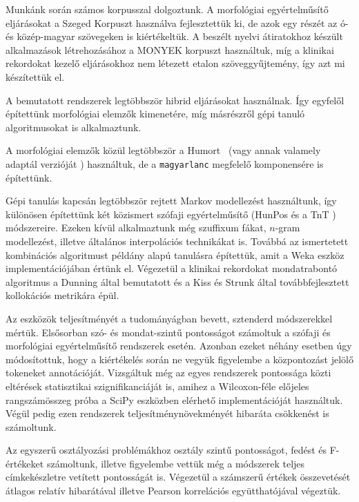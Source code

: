 Munkánk során számos korpusszal dolgoztunk.
A morfológiai egyértelműsítő eljárásokat a Szeged Korpuszt \cite{Csendes2004} használva fejlesztettük ki, de azok egy részét az ó- és közép-magyar szövegeken \cite{Novak2013} is kiértékeltük.
A beszélt nyelvi átiratokhoz készült alkalmazások létrehozásához a MONYEK korpuszt \cite{Matyus2014} használtuk, míg a klinikai rekordokat kezelő eljárásokhoz nem létezett etalon szöveggyűjtemény, így azt mi készítettük el.

A bemutatott rendszerek legtöbbször hibrid eljárásokat használnak. 
Így egyfelől építettünk morfológiai elemzők kimenetére, míg másrészről gépi tanuló algoritmusokat is alkalmaztunk.

A morfológiai elemzők közül legtöbbször a Humort~\cite{Proszeky1994,Novak2003,Proszeky2005} (vagy annak valamely adaptál verzióját \cite{Novak2013,NovakOMK,Orosz2013}) használtuk, de a \texttt{magyarlanc} \cite{zsibrata2013magyarlanc} megfelelő komponensére is építettünk. 

Gépi tanulás kapcsán legtöbbször rejtett Markov modellezést \cite{Rabiner1989,Samuelsson1993}  használtunk, így különösen építettünk két közismert szófaji egyértelműsítő (HunPos  \cite{Halacsy2007} és a TnT \cite{Brants2000}) módszereire.
Ezeken kívül alkalmaztunk még szuffixum fákat, $n$-gram modellezést, illetve általános interpolációs technikákat is.
Továbbá az ismertetett kombinációs algoritmust példány alapú tanulásra \cite{Aha1991} építettük, amit a Weka \cite{Hall2009} eszköz implementációjában értünk el.
Végezetül a klinikai rekordokat mondatrabontó algoritmus a Dunning által bemutatott \cite{dunning1993accurate} és a Kiss és Strunk által továbbfejlesztett \cite{kiss2006unsupervised} kollokációs metrikára épül.

Az eszközök teljesítményét a tudományágban bevett, sztenderd módszerekkel mértük.
Elsősorban szó- és mondat-szintű pontosságot számoltuk a szófaji és morfológiai egyértelműsítő rendszerek esetén.
Azonban ezeket néhány esetben úgy módosítottuk, hogy a kiértékelés során ne vegyük figyelembe a központozást jelölő tokeneket annotációját.
Vizsgáltuk még az egyes rendszerek pontossága közti eltérések statisztikai szignifikanciáját is, amihez a Wilcoxon-féle előjeles rangszámösszeg próba a SciPy \cite{scipy} eszközben elérhető implementációját használtuk.
Végül pedig ezen rendszerek teljesítménynövekményét hibaráta csökkenést is számoltunk.

Az egyszerű osztályozási problémákhoz osztály szintű pontosságot, fedést és F-értékeket számoltunk, illetve figyelembe vettük még a módszerek teljes címkekészletre vetített pontosságát is.
Végezetül a számszerű értékek összevetését átlagos relatív hibarátával \cite{Witten2011} illetve
Pearson korrelációs együtthatójával \cite{Witten2011} végeztük.